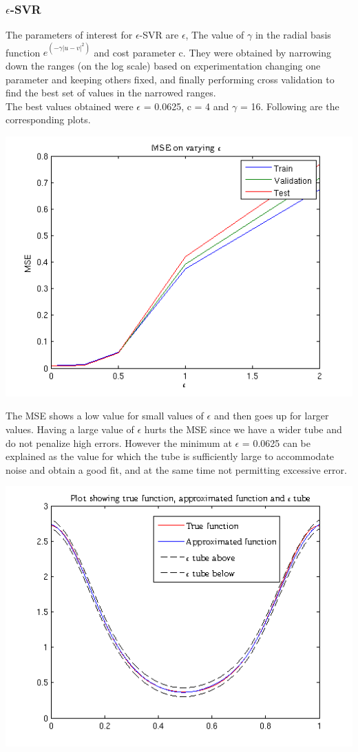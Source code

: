 \documentclass{article}
\begin{document}
\subsubsection{$\epsilon$-SVR}
The parameters of interest for $\epsilon$-SVR are $\epsilon$, The value of $\gamma$ in the radial basis function $e^{(-\gamma|u-v|^2)}$ and cost parameter c. They were obtained by narrowing down the ranges (on the log scale) based on experimentation changing one parameter and keeping others fixed, and finally performing cross validation to find the best set of values in the narrowed ranges. \\[5pt]
The best values obtained were $\epsilon$ = 0.0625, c = 4 and $\gamma$ = 16. Following are the corresponding plots.
\begin{center}
\includegraphics[scale=1]{Regression/mse}
\end{center}
The MSE shows a low value for small values of $\epsilon$ and then goes up for larger values. Having a large value of $\epsilon$ hurts the MSE since we have a wider tube and do not penalize high errors. However the minimum at $\epsilon$ = 0.0625 can be explained as the value for which the tube is sufficiently large to accommodate noise and obtain a good fit, and at the same time not permitting excessive error.
\begin{center}
\includegraphics[scale=1]{Regression/Plot_1}
\end{center}
\end{document}

